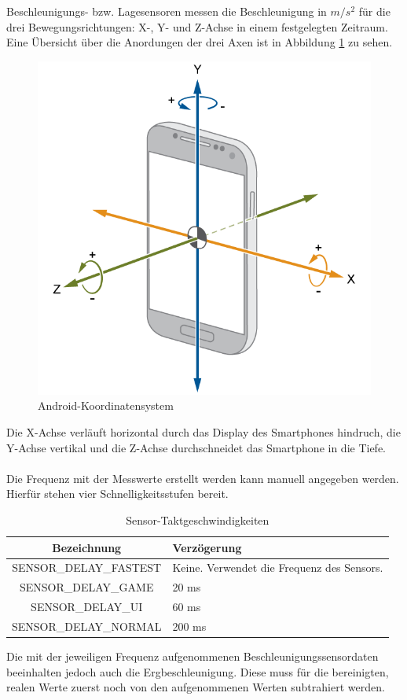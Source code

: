 \documentclass[11pt,a4paper]{report}
\begin{document}
Beschleunigungs- bzw. Lagesensoren messen die Beschleunigung in $m/s^2$ für die drei Bewegungsrichtungen: X-, Y- und Z-Achse in einem festgelegten Zeitraum.
Eine Übersicht über die Anordungen der drei Axen ist in Abbildung \ref{fig:and_axes} zu sehen.
\begin{figure}[htbp]
  \centering
  \includegraphics[width=.7\textwidth]{images/android_axes.png}
  \caption{Android-Koordinatensystem}
  \label{fig:and_axes}
\end{figure}
Die X-Achse verläuft horizontal durch das Display des Smartphones hindruch, die Y-Achse vertikal und die Z-Achse durchschneidet das Smartphone in die Tiefe.
\\\\
Die Frequenz mit der Messwerte erstellt werden kann manuell angegeben werden.
Hierfür stehen vier Schnelligkeitsstufen bereit.
\begin{table}[htbp]
  \centering
  \begin{tabular}{|c|p{4cm}|}
      \hline
      \textbf{Bezeichnung} & \textbf{Verzögerung} \\
	  \hline
      SENSOR\_DELAY\_FASTEST & Keine. Verwendet die Frequenz des Sensors.\\
      \hline
      SENSOR\_DELAY\_GAME & 20 ms\\
      \hline
      SENSOR\_DELAY\_UI & 60 ms\\
      \hline
      SENSOR\_DELAY\_NORMAL & 200 ms\\
      \hline
  \end{tabular}
  \caption{Sensor-Taktgeschwindigkeiten\cite{sensor-takt}}
  \label{tab:sensor_speeds}
\end{table}
Die mit der jeweiligen Frequenz aufgenommenen Beschleunigungssensordaten beeinhalten jedoch auch die Ergbeschleunigung.
Diese muss für die bereinigten, realen Werte zuerst noch von den aufgenommenen Werten subtrahiert werden\cite{accel_g}.
\end{document}
